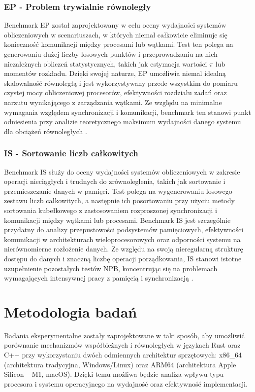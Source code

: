 \subsubsection{EP - Problem trywialnie równoległy}
Benchmark EP  został zaprojektowany w celu oceny wydajności systemów obliczeniowych w scenariuszach, w których niemal całkowicie eliminuje się konieczność komunikacji między procesami lub wątkami. Test ten polega na generowaniu dużej liczby losowych punktów i przeprowadzaniu na nich niezależnych obliczeń statystycznych, takich jak estymacja wartości $\pi$ lub momentów rozkładu. Dzięki swojej naturze, EP umożliwia niemal idealną skalowalność równoległą i jest wykorzystywany przede wszystkim do pomiaru czystej mocy obliczeniowej procesorów, efektywności rozdziału zadań oraz narzutu wynikającego z zarządzania wątkami. Ze względu na minimalne wymagania względem synchronizacji i komunikacji, benchmark ten stanowi punkt odniesienia przy analizie teoretycznego maksimum wydajności danego systemu dla obciążeń równoległych \cite{nasaParallelBenchmarks}.

\subsubsection{IS - Sortowanie liczb całkowitych}
Benchmark IS  służy do oceny wydajności systemów obliczeniowych w zakresie operacji nieciągłych i trudnych do zrównoleglenia, takich jak sortowanie i przemieszczanie danych w pamięci. Test polega na wygenerowaniu losowego zestawu liczb całkowitych, a następnie ich posortowaniu przy użyciu metody sortowania kubełkowego  z zastosowaniem rozproszonej synchronizacji i komunikacji między wątkami lub procesami. Benchmark IS jest szczególnie przydatny do analizy przepustowości podsystemów pamięciowych, efektywności komunikacji w architekturach wieloprocesorowych oraz odporności systemu na nierównomierne rozłożenie danych. Ze względu na swoją nieregularną strukturę dostępu do danych i znaczną liczbę operacji porządkowania, IS stanowi istotne uzupełnienie pozostałych testów NPB, koncentrując się na problemach wymagających intensywnej pracy z pamięcią i synchronizacją \cite{nasaParallelBenchmarks}.

\section{Metodologia badań}
Badania eksperymentalne zostały zaprojektowane w taki sposób, aby umożliwić porównanie mechanizmów współbieżnych i równoległych w językach Rust oraz C++ przy wykorzystaniu dwóch odmiennych architektur sprzętowych: x86\_64 (architektura tradycyjna, Windows/Linux) oraz ARM64 (architektura Apple Silicon – M1, macOS). Dzięki temu możliwa będzie analiza wpływu typu procesora i systemu operacyjnego na wydajność oraz efektywność implementacji.

